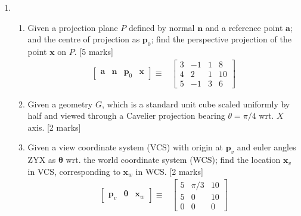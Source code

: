 \documentclass[11pt]{tiet-question-paper}
\begin{document}
\begin{enumerate}[resume]
\item \begin{enumerate}
\item Given a projection plane \(P\) defined by normal
\(\textbf{n}\) and a reference point \(\textbf{a}\);
and the centre of projection as \(\mathbf{p}_0\);
find the perspective projection of the point
\(\textbf{x}\) on \(P\). \hfill [5 marks]
\begin{align*}
  \begin{bmatrix}
    \mathbf{a}&\mathbf{n}&\mathbf{p}_0&\mathbf{x}
  \end{bmatrix}\equiv
  &
    \begin{bmatrix}
      3&-1&1&8\\4&2&1&10\\5&-1&3&6
    \end{bmatrix}
\end{align*}
\item Given a geometry \(G\), which is a standard unit
cube scaled uniformly by half and viewed through
a Cavelier projection bearing \(\theta=\pi/4\)
wrt. \(X\) axis. \hfill [2 marks]
\item Given a view coordinate system (VCS) with origin
at \(\textbf{p}_v\) and euler angles ZYX as
\(\boldsymbol{\theta}\) wrt. the world coordinate
system (WCS); find the location \(\mathbf{x}_v\) in
VCS, corresponding to \(\textbf{x}_w\) in
WCS. \hfill [2 marks]
\begin{align*}
  \begin{bmatrix}
    \mathbf{p}_v & \boldsymbol{\theta} & \mathbf{x}_w
  \end{bmatrix}\equiv
  &\begin{bmatrix}
    5&\pi/3&10\\5&0&10\\0&0&0
  \end{bmatrix}
\end{align*}
\end{enumerate}
\end{enumerate}

\bvrhrule
\end{document}
